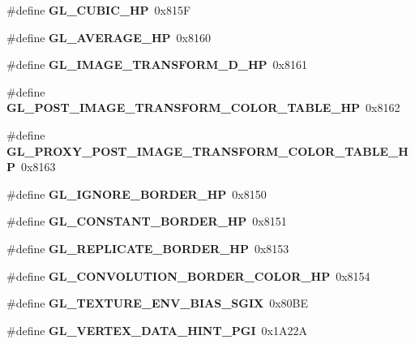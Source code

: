 \begin{DoxyCompactItemize}
\item 
\#define {\bfseries G\+L\+\_\+\+C\+U\+B\+I\+C\+\_\+\+H\+P}~0x815\+F\label{_s_d_l__opengl_8h_a1ddeb0c5eb581940ac588c56ebb84b68}

\item 
\#define {\bfseries G\+L\+\_\+\+A\+V\+E\+R\+A\+G\+E\+\_\+\+H\+P}~0x8160\label{_s_d_l__opengl_8h_aae60ee0f07c5b7ae96176f163546194c}

\item 
\#define {\bfseries G\+L\+\_\+\+I\+M\+A\+G\+E\+\_\+\+T\+R\+A\+N\+S\+F\+O\+R\+M\+\_\+D\+\_\+\+H\+P}~0x8161\label{_s_d_l__opengl_8h_a17928a5390c0feb85b6998a73f2d08a2}

\item 
\#define {\bfseries G\+L\+\_\+\+P\+O\+S\+T\+\_\+\+I\+M\+A\+G\+E\+\_\+\+T\+R\+A\+N\+S\+F\+O\+R\+M\+\_\+\+C\+O\+L\+O\+R\+\_\+\+T\+A\+B\+L\+E\+\_\+\+H\+P}~0x8162\label{_s_d_l__opengl_8h_ad88f4dc3e570a35e10d3e1e5d2a7144e}

\item 
\#define {\bfseries G\+L\+\_\+\+P\+R\+O\+X\+Y\+\_\+\+P\+O\+S\+T\+\_\+\+I\+M\+A\+G\+E\+\_\+\+T\+R\+A\+N\+S\+F\+O\+R\+M\+\_\+\+C\+O\+L\+O\+R\+\_\+\+T\+A\+B\+L\+E\+\_\+\+H\+P}~0x8163\label{_s_d_l__opengl_8h_ac78cbe27b2599501b782528829a6dff0}

\item 
\#define {\bfseries G\+L\+\_\+\+I\+G\+N\+O\+R\+E\+\_\+\+B\+O\+R\+D\+E\+R\+\_\+\+H\+P}~0x8150\label{_s_d_l__opengl_8h_acc17d8aa1369423e27b27cc9a19f54c8}

\item 
\#define {\bfseries G\+L\+\_\+\+C\+O\+N\+S\+T\+A\+N\+T\+\_\+\+B\+O\+R\+D\+E\+R\+\_\+\+H\+P}~0x8151\label{_s_d_l__opengl_8h_a0ef7929f35e85429fe38fc141d8a4d58}

\item 
\#define {\bfseries G\+L\+\_\+\+R\+E\+P\+L\+I\+C\+A\+T\+E\+\_\+\+B\+O\+R\+D\+E\+R\+\_\+\+H\+P}~0x8153\label{_s_d_l__opengl_8h_abbd1632c0db369fa580b8bb68e756c80}

\item 
\#define {\bfseries G\+L\+\_\+\+C\+O\+N\+V\+O\+L\+U\+T\+I\+O\+N\+\_\+\+B\+O\+R\+D\+E\+R\+\_\+\+C\+O\+L\+O\+R\+\_\+\+H\+P}~0x8154\label{_s_d_l__opengl_8h_ad3afce16af1b58bf9b60483b1b8d544f}

\item 
\#define {\bfseries G\+L\+\_\+\+T\+E\+X\+T\+U\+R\+E\+\_\+\+E\+N\+V\+\_\+\+B\+I\+A\+S\+\_\+\+S\+G\+I\+X}~0x80\+B\+E\label{_s_d_l__opengl_8h_a3eff01c4519e06fde9a8e57f96e0d14b}

\item 
\#define {\bfseries G\+L\+\_\+\+V\+E\+R\+T\+E\+X\+\_\+\+D\+A\+T\+A\+\_\+\+H\+I\+N\+T\+\_\+\+P\+G\+I}~0x1\+A22\+A\label{_s_d_l__opengl_8h_a447f7bb0d896b42ee3e1c9460ea52b2d}


\end{DoxyCompactItemize}
